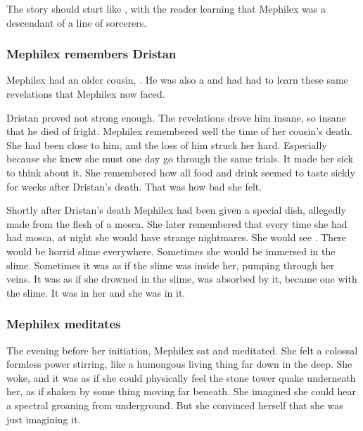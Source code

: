 The story should start like \cite{RobertBloch:TheSecretintheTomb}, with the reader learning that Mephilex was a descendant of a line of sorcerers.






\subsubsection{Mephilex remembers Dristan}
Mephilex had an older cousin, . 
He was also a \rethyax and had had to learn these same revelations that Mephilex now faced. 

Dristan proved not strong enough.
The revelations drove him insane, so insane that he died of fright.
Mephilex remembered well the time of her cousin's death.
She had been close to him, and the loss of him struck her hard.
Especially because she knew she must one day go through the same trials.
It made her sick to think about it.
She remembered how all food and drink seemed to taste sickly for weeks after Dristan's death. 
That was how bad she felt.

Shortly after Dristan's death Mephilex had been given a special dish, allegedly made from the flesh of a mosca. 
She later remembered that every time she had had mosca, at night she would have strange nightmares. 
She would see \Ubloth.
There would be horrid slime everywhere. 
Sometimes she would be immersed in the slime.
Sometimes it was as if the slime was inside her, pumping through her veins.
It was as if she drowned in the slime, was absorbed by it, became one with the slime. 
It was in her and she was in it. 






\subsubsection{Mephilex meditates}
The evening before her initiation, Mephilex sat and meditated. 
She felt a colossal formless power stirring, like a humongous living thing far down in the deep. 
She woke, and it was as if she could physically feel the stone tower quake underneath her, as if shaken by some thing moving far beneath.
She imagined she could hear a spectral groaning from underground.
But she convinced herself that she was just imagining it. 

